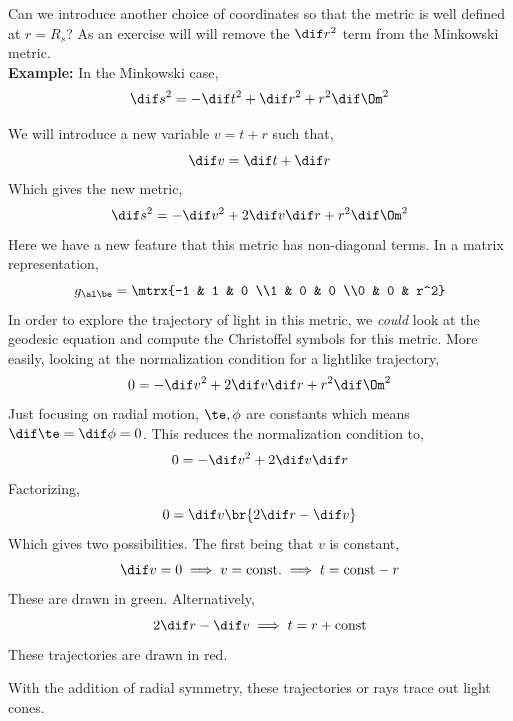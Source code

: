 \documentclass{article}
\begin{document}
Can we introduce another choice of coordinates so that the metric is well defined at $r = R_s$? As an exercise will will remove the $\dif r^2$ term from the Minkowski metric. \\

\textbf{Example:} In the Minkowski case,
\[ \dif s^2 = - \dif t^2 + \dif r^2 + r^2 \dif \Om^2 \]

We will introduce a new variable $v = t + r$ such that,
\[ \dif v = \dif t + \dif r \]
Which gives the new metric,
\[ \dif s^2 = - \dif v^2 + 2 \dif v \dif r + r^2 \dif \Om^2 \]
Here we have a new feature that this metric has non-diagonal terms. In a matrix representation,
\[ g_{\al\be} = \mtrx{-1 & 1 & 0 \\1 & 0 & 0 \\0 & 0 & r^2} \]
In order to explore the trajectory of light in this metric, we \textit{could} look at the geodesic equation and compute the Christoffel symbols for this metric. More easily, looking at the normalization condition for a lightlike trajectory,
\[ 0 = - \dif v^2 + 2 \dif v \dif r + r^2 \dif \Om^2 \]
Just focusing on radial motion, $\te, \phi$ are constants which means $\dif \te = \dif \phi = 0$. This reduces the normalization condition to,
\[ 0 = - \dif v^2 + 2 \dif v \dif r \]
Factorizing,
\[ 0 = \dif v \br{2 \dif r - \dif v} \]
Which gives two possibilities. The first being that $v$ is constant,
\[ \dif v = 0 \implies v = \text{const.} \implies t = \text{const} - r \]
These are drawn in green. Alternatively,
\[ 2 \dif r - \dif v \implies t = r + \text{const} \]
These trajectories are drawn in red.

\begin{center}
\end{center}
With the addition of radial symmetry, these trajectories or rays trace out light cones. \\
\end{document}
